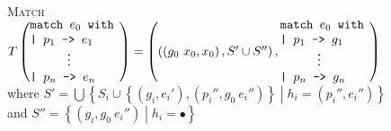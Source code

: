 \documentclass{article}
\def\splat{\bullet}
\newcommand{\ruletitle}[1]{\textsc{#1}\\}
\newcommand{\var}{x}
\newcommand{\contgoto}{g}
\newcommand{\hg}{h}
\newcommand{\hset}{S}
\newcommand{\code}[1]{\texttt{#1}}
\begin{document}
    \ruletitle{Match}
    $
        T\left(
            \parbox{25mm}{%
                \code{%
                    match $e_0$ with \\
                    | $p_1$ -> $e_1$ \\
                    \hspace*{10mm}$\vdots$ \\
                    | $p_n$ -> $e_n$
                }%
            }
        \right)
        =
        \left(
            \left(
                \left(
                    \contgoto_0\ \var_0,
                    \var_0
                \right),
                \hset' \cup \hset''
            \right),
            \parbox{25mm}{%
                \code{%
                    match $e_0$ with \\
                    | $p_1$ -> $\contgoto_1$ \\
                    \hspace*{10mm}$\vdots$ \\
                    | $p_n$ -> $\contgoto_n$
                }%
            }
        \right)
    $
    \\ where
    $\hset' = \bigcup
        \left\{
            \hset_i \cup \left\{
                \left(
                    \contgoto_i,
                    e_i'
                \right),
                \left(
                    p_i'',
                    \contgoto_0\ e_i''
                \right)
            \right\}
            \middle|
            \hg_i = (p_i'', e_i'')
        \right\}
    $
    \\ and
    $\hset'' =
        \left\{
            \left(
                \contgoto_i,
                \contgoto_0\ e_i''
            \right)
        \middle|
        \hg_i = \splat
        \right\}
    $
\end{document}
